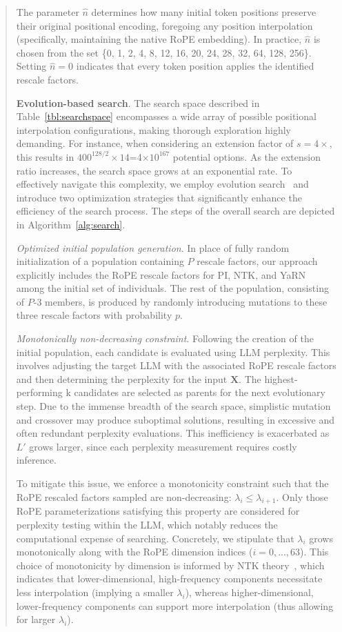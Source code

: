 \begin{abstract}
The parameter $\hat{n}$ determines how many initial token positions preserve their original positional encoding, foregoing any position interpolation (specifically, maintaining the native RoPE embedding). In practice, $\hat{n}$ is chosen from the set \{0, 1, 2, 4, 8, 12, 16, 20, 24, 28, 32, 64, 128, 256\}. Setting $\hat{n}=0$ indicates that every token position applies the identified rescale factors.

\textbf{Evolution-based search}. The search space described in Table~\ref{tbl:searchspace} encompasses a wide array of possible positional interpolation configurations, making thorough exploration highly demanding. For instance, when considering an extension factor of $s=4\times$, this results in $400^{128/2}\times14$=4$\times10^{167}$ potential options. As the extension ratio increases, the search space grows at an exponential rate. To effectively navigate this complexity, we employ evolution search~\cite{guo2020single} and introduce two optimization strategies that significantly enhance the efficiency of the search process. The steps of the overall search are depicted in Algorithm~\ref{alg:search}.

\textit{Optimized initial population generation}. In place of fully random initialization of a population containing $P$ rescale factors, our approach explicitly includes the RoPE rescale factors for PI, NTK, and YaRN among the initial set of individuals. The rest of the population, consisting of $P$-3 members, is produced by randomly introducing mutations to these three rescale factors with probability $p$.

\textit{Monotonically non-decreasing constraint}. Following the creation of the initial population, each candidate is evaluated using LLM perplexity. This involves adjusting the target LLM with the associated RoPE rescale factors and then determining the perplexity for the input $\mathbf{X}$. The highest-performing k candidates are selected as parents for the next evolutionary step. Due to the immense breadth of the search space, simplistic mutation and crossover may produce suboptimal solutions, resulting in excessive and often redundant perplexity evaluations. This inefficiency is exacerbated as $L'$ grows larger, since each perplexity measurement requires costly inference.

To mitigate this issue, we enforce a monotonicity constraint such that the RoPE rescaled factors sampled are non-decreasing: $\lambda_i\le \lambda_{i+1}$. Only those RoPE parameterizations satisfying this property are considered for perplexity testing within the LLM, which notably reduces the computational expense of searching. Concretely, we stipulate that $\lambda_i$ grows monotonically along with the RoPE dimension indices ($i = 0, ..., 63$). This choice of monotonicity by dimension is informed by NTK theory~\cite{jacot2018neural,tancik2020fourier,ntk}, which indicates that lower-dimensional, high-frequency components necessitate less interpolation (implying a smaller $\lambda_i$), whereas higher-dimensional, lower-frequency components can support more interpolation (thus allowing for larger $\lambda_i$).


\end{abstract}
